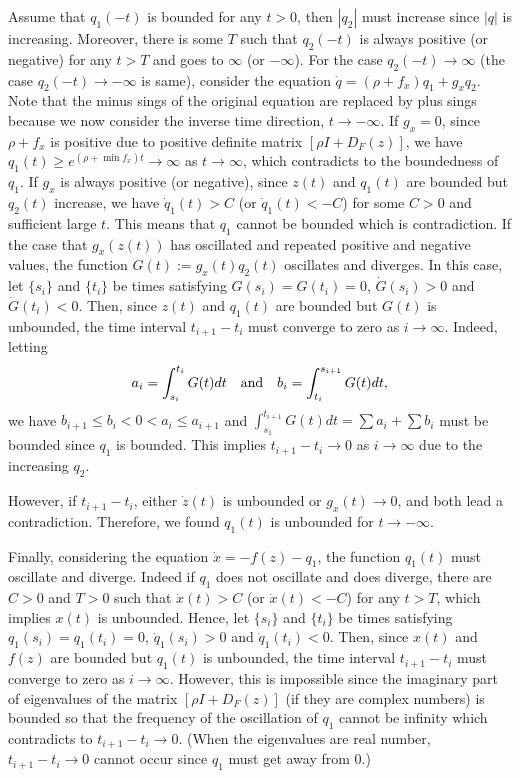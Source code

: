 \documentclass[11pt,reqno]{amsart}
\begin{document}
Assume that $q_1(-t)$ is bounded for any $t>0$, then $|q_2|$ must increase since $|q|$ is increasing. Moreover, there is some $T$ such that $q_2(-t)$ is always positive (or negative) for any $t>T$ and goes to $\infty$ (or $-\infty$). For the case $q_2(-t)\to\infty$ (the case $q_2(-t)\to-\infty$ is same), consider the equation $\dot{q}=(\rho+f_x)q_1+g_xq_2$. Note that the minus sings of the original equation are replaced by plus sings because we now consider the inverse time direction, $t\to-\infty$. If $g_x=0$, since $\rho+f_x$ is positive due to positive definite matrix $[\rho I+D_F(z)]$, we have $q_1(t)\geq e^{(\rho+\min f_x)t}\to\infty$ as $t\to\infty$, which contradicts to the boundedness of $q_1$. If $g_x$ is always positive (or negative), since $z(t)$ and $q_1(t)$ are bounded but $q_2(t)$ increase, we have $\dot{q}_1(t)>C$ (or $\dot{q}_1(t)<-C$) for some $C>0$ and sufficient large $t$. This means that $q_1$ cannot be bounded which is contradiction. If the case that $g_x(z(t))$ has oscillated and repeated positive and negative values, the function $G(t):=g_x(t)q_2(t)$ oscillates and diverges. In this case, let $\{s_i\}$ and $\{t_i\}$ be times satisfying  $G(s_i)=G(t_i)=0$, $\dot{G}(s_i)>0$ and $\dot{G}(t_i)<0$. Then, since $z(t)$ and $q_1(t)$ are bounded but $G(t)$ is unbounded, the time interval $t_{i+1}-t_i$ must converge to zero as $i\to\infty$. Indeed, letting 
$$
a_i=\int_{s_i}^{t_i}G(t)dt \quad {\rm and } \quad b_i=\int_{t_i}^{s_{i+1}}G(t)dt,
$$
we have $b_{i+1}\leq b_i<0<a_i\leq a_{i+1}$ and $\int_{s_1}^{t_{i+1}}G(t)dt=\sum a_i + \sum b_i$ must be bounded since $q_1$ is bounded. This implies $t_{i+1}-t_i\to0$ as $i\to\infty$ due to the increasing $q_2$. 

However, if $t_{i+1}-t_i$, either $\dot{z}(t)$ is unbounded or $g_x(t)\to0$, and both lead a contradiction. Therefore, we found $q_1(t)$ is unbounded for $t\to-\infty$. 

Finally, considering the equation $\dot{x}=-f(z)-q_1$, the function $q_1(t)$ must oscillate and diverge. Indeed if $q_1$ does not oscillate and does diverge, there are $C>0$ and $T>0$ such that $\dot{x}(t)>C$ (or $\dot{x}(t)<-C$) for any $t>T$, which implies $x(t)$ is unbounded. Hence, let $\{s_i\}$ and $\{t_i\}$ be times satisfying  $q_1(s_i)=q_1(t_i)=0$, $\dot{q}_1(s_i)>0$ and $\dot{q}_1(t_i)<0$. Then, since $x(t)$ and $f(z)$ are bounded but $q_1(t)$ is unbounded, the time interval $t_{i+1}-t_i$ must converge to zero as $i\to\infty$. However, this is impossible since the imaginary part of eigenvalues of the matrix $[\rho I + D_F(z)]$ (if they are complex numbers) is bounded so that the frequency of the oscillation of $q_1$ cannot be infinity which contradicts to $t_{i+1}-t_i\to0$. (When the eigenvalues are real number, $t_{i+1}-t_i\to0$ cannot occur since $q_1$ must get away from 0.) 
\end{document}
